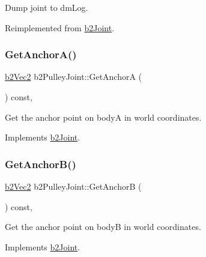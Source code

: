 Dump joint to dm\+Log. 



Reimplemented from \mbox{\hyperlink{classb2_joint_abd35e7316017ad9a40d5dbf9b5ba3f36}{b2\+Joint}}.

\mbox{\label{classb2_pulley_joint_af7167643e6d72d879eea619a368194c1}} 
\subsubsection{\texorpdfstring{GetAnchorA()}{GetAnchorA()}}
{\footnotesize\ttfamily \mbox{\hyperlink{structb2_vec2}{b2\+Vec2}} b2\+Pulley\+Joint\+::\+Get\+AnchorA (\begin{DoxyParamCaption}{ }\end{DoxyParamCaption}) const\hspace{0.3cm}{\ttfamily [override]}, {\ttfamily [virtual]}}



Get the anchor point on bodyA in world coordinates. 



Implements \mbox{\hyperlink{classb2_joint_abe46ca3aad5db73909a9b5a7b2117447}{b2\+Joint}}.

\mbox{\label{classb2_pulley_joint_aee56f103c1d1d30fcbd3a8570e321ba9}} 
\subsubsection{\texorpdfstring{GetAnchorB()}{GetAnchorB()}}
{\footnotesize\ttfamily \mbox{\hyperlink{structb2_vec2}{b2\+Vec2}} b2\+Pulley\+Joint\+::\+Get\+AnchorB (\begin{DoxyParamCaption}{ }\end{DoxyParamCaption}) const\hspace{0.3cm}{\ttfamily [override]}, {\ttfamily [virtual]}}



Get the anchor point on bodyB in world coordinates. 



Implements \mbox{\hyperlink{classb2_joint_a88e947c65d4ea26fe539f02a8cb7f7a9}{b2\+Joint}}.

\mbox{\label{classb2_pulley_joint_a4b4f29d81b7d2ffdda5af2f588f49ab6}} 

